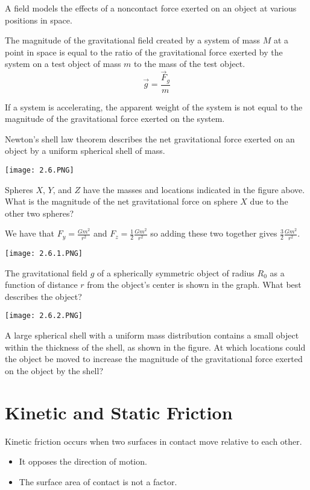 \documentclass[../mech.tex]{subfiles}
\begin{document}
A field models the effects of a noncontact force exerted on an object at various positions in space.

The magnitude of the gravitational field created by a system of mass $M$ at a point in space is equal to the ratio of the gravitational force exerted by the system on a test object of mass $m$ to the mass of the test object. 
\[ \vec{g}=\frac{\vec{F}_g}{m} \]

If a system is accelerating, the apparent weight of the system is not equal to the magnitude of the gravitational force exerted on the system.

Newton's shell law theorem describes the net gravitational force exerted on an object by a uniform spherical shell of mass.

\begin{example}
    \begin{center}
        \texttt{[image: 2.6.PNG]}
    \end{center}
    Spheres $X$, $Y$, and $Z$ have the masses and locations indicated in the figure above. What is the magnitude of the net gravitational force on sphere $X$ due to the other two spheres?

    We have that $F_y=\frac{Gm^2}{r^2}$ and $F_z= \frac{1}{2}\frac{Gm^2}{r^2}$ so adding these two together gives $\frac{3}{2}\frac{Gm^2}{r^2}$.
\end{example}

\ex \begin{center}
    \texttt{[image: 2.6.1.PNG]}
\end{center}
The gravitational field $g$ of a spherically symmetric object of radius $R_0$ as a function of distance $r$ from the object's center is shown in the graph. What best describes the object?

\ex \begin{center}
    \texttt{[image: 2.6.2.PNG]}
\end{center}
A large spherical shell with a uniform mass distribution contains a small object within the thickness of the shell, as shown in the figure. At which locations could the object be moved to increase the magnitude of the gravitational force exerted on the object by the shell?

\section{Kinetic and Static Friction}
Kinetic friction occurs when two surfaces in contact move relative to each other.
\begin{itemize}
    \item It opposes the direction of motion.
    \item The surface area of contact is not a factor.
\end{itemize}
\end{document}
